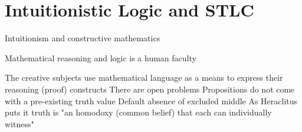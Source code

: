 \documentclass{beamer}
\begin{document}
\section{Intuitionistic Logic and STLC} 
\begin{frame}{Intuitionism and constructive mathematics}
  \begin{outline}
    
    
  \1[] Mathematical reasoning and logic is a human faculty
  
  \2[!] The creative subjects use mathematical language 
  as a means to express their reasoning (proof) constructs
  \2[!] 
  There are open problems
  \2[!] 
  Propositions do not come with a pre-existing truth value
  \3[!!] 
  Default absence of excluded middle
  \2[!] As Heraclitus puts it truth is "an homodoxy (common belief) that each can individually witness"
\end{outline}
\end{frame}
\end{document}
